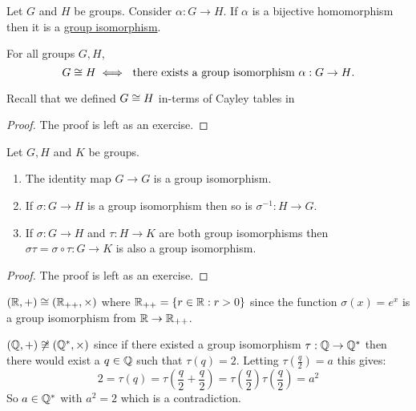 \documentclass[11pt]{article}
\begin{document}
\begin{definition}
    Let $G$ and $H$ be groups. Consider $\alpha:G\to H$. If $\alpha$ is a bijective homomorphism then it is a \ul{group isomorphism}.
\end{definition}

\begin{proposition}
    For all groups $G,H$,
    \[G\cong H\iff\text{ there exists a group isomorphism $\alpha:G\to H$}.\]
\end{proposition}

\begin{remark}
    Recall that we defined $G\cong H$ in-terms of Cayley tables in 
\end{remark}

\begin{proof}
    The proof is left as an exercise.
\end{proof}

\begin{proposition} Let $G,H$ and $K$ be groups.
    \begin{enumerate}
        \item The identity map $G\to G$ is a group isomorphism.
        \item If $\sigma:G\to H$ is a group isomorphism then so is $\sigma^{-1}:H\to G$.
        \item If $\sigma:G\to H$ and $\tau:H\to K$ are both group isomorphisms then $\sigma\tau=\sigma\circ\tau:G\to K$ is also a group isomorphism.
    \end{enumerate}
\end{proposition}

\begin{proof}
    The proof is left as an exercise.
\end{proof}

\begin{example}
    $(\mathbb{R},+)\cong(\mathbb{R}_{++},\times)$ where $\mathbb{R}_{++}=\{r\in\mathbb{R}:r>0\}$ since the function $\sigma(x)=e^x$ is a group isomorphism from $\mathbb{R}\to\mathbb{R}_{++}$.
\end{example}

\begin{example}
    $(\mathbb{Q},+)\not\cong(\mathbb{Q}^*,\times)$ since if there existed a group isomorphism $\tau:\mathbb{Q}\to\mathbb{Q}^*$ then there would exist a $q\in\mathbb{Q}$ such that $\tau(q)=2$. Letting $\tau(\frac{q}{2})=a$ this gives:
    \[2=\tau(q)=\tau\left(\frac q2+\frac q2\right)=\tau\left(\frac q2\right)\tau\left(\frac q2\right)=a^2\]
    So $a\in\mathbb{Q}^*$ with $a^2=2$ which is a contradiction.
\end{example}
\end{document}
